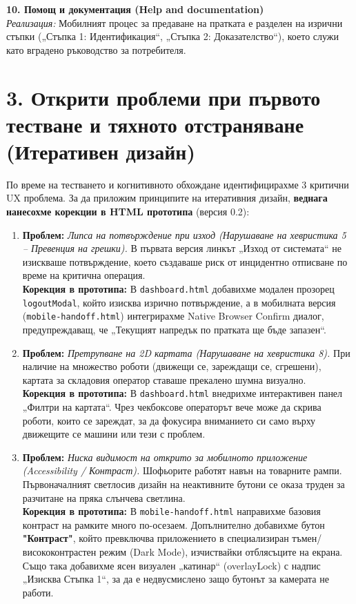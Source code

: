 \documentclass[12pt, a4paper]{article}
\begin{document}
\textbf{10. Помощ и документация (Help and documentation)}\\
\textit{Реализация:} Мобилният процес за предаване на пратката е разделен на изрични стъпки („Стъпка 1: Идентификация“, „Стъпка 2: Доказателство“), което служи като вградено ръководство за потребителя.

\section*{3. Открити проблеми при първото тестване и тяхното отстраняване (Итеративен дизайн)}

По време на тестването и когнитивното обхождане идентифицирахме 3 критични UX проблема. За да приложим принципите на итеративния дизайн, \textbf{веднага нанесохме корекции в HTML прототипа} (версия 0.2):

\begin{enumerate}
\item \textbf{Проблем:} \textit{Липса на потвърждение при изход (Нарушаване на хевристика 5 -- Превенция на грешки).} В първата версия линкът „Изход от системата“ не изискваше потвърждение, което създаваше риск от инцидентно отписване по време на критична операция.
\\
\textbf{Корекция в прототипа:} В \texttt{dashboard.html} добавихме модален прозорец \texttt{logoutModal}, който изисква изрично потвърждение, а в мобилната версия (\texttt{mobile-handoff.html}) интегрирахме Native Browser Confirm диалог, предупреждаващ, че „Текущият напредък по пратката ще бъде запазен“.

\item \textbf{Проблем:} \textit{Претрупване на 2D картата (Нарушаване на хевристика 8).} При наличие на множество роботи (движещи се, зареждащи се, сгрешени), картата за складовия оператор ставаше прекалено шумна визуално.
\\
\textbf{Корекция в прототипа:} В \texttt{dashboard.html} внедрихме интерактивен панел „Филтри на картата“. Чрез чекбоксове операторът вече може да скрива роботи, които се зареждат, за да фокусира вниманието си само върху движещите се машини или тези с проблем.

\item \textbf{Проблем:} \textit{Ниска видимост на открито за мобилното приложение (Accessibility / Контраст).} Шофьорите работят навън на товарните рампи. Първоначалният светлосив дизайн на неактивните бутони се оказа труден за разчитане на пряка слънчева светлина.
\\
\textbf{Корекция в прототипа:} В \texttt{mobile-handoff.html} направихме базовия контраст на рамките много по-осезаем. Допълнително добавихме бутон \textbf{"Контраст"}, който превключва приложението в специализиран тъмен/висококонтрастен режим (Dark Mode), изчиствайки отблясъците на екрана. Също така добавихме ясен визуален „катинар“ (overlayLock) с надпис „Изисква Стъпка 1“, за да е недвусмислено защо бутонът за камерата не работи.
\end{enumerate}
\end{document}
